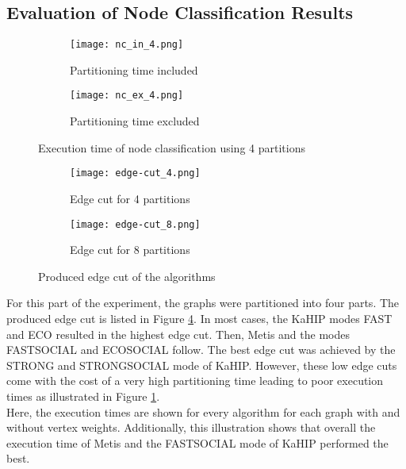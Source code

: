 \documentclass[acmsmall,nonacm,screen,review]{acmart}
\begin{document}
\subsection{Evaluation of Node Classification Results}
\begin{figure}[bt!]
     \centering
     \begin{subfigure}[b]{0.45\textwidth}
         \centering
         \texttt{[image: nc\_in\_4.png]}
         \caption{Partitioning time included}
         \label{nc_in_4}
     \end{subfigure}
     \hfill
     \begin{subfigure}[b]{0.45\textwidth}
         \centering
         \texttt{[image: nc\_ex\_4.png]}
         \caption{Partitioning time excluded}
         \label{nc_ex_4}
     \end{subfigure}
     \caption{Execution time of node classification using 4 partitions}
     \label{nc_results}
\end{figure}
\begin{figure}[bt!]
     \centering
     \begin{subfigure}[b]{0.45\textwidth}
         \centering
         \texttt{[image: edge-cut\_4.png]}
         \caption{Edge cut for 4 partitions}
         \label{cut_4}
     \end{subfigure}
     \hfill
     \begin{subfigure}[b]{0.45\textwidth}
         \centering
         \texttt{[image: edge-cut\_8.png]}
         \caption{Edge cut for 8 partitions}
         \label{cut_8}
     \end{subfigure}
     \caption{Produced edge cut of the algorithms}
     \label{cut}
\end{figure}
For this part of the experiment, the graphs were partitioned into four parts. The produced edge cut is listed in Figure \ref{cut_4}. In most cases, the KaHIP modes FAST and ECO resulted in the highest edge cut. Then, Metis and the modes FASTSOCIAL and ECOSOCIAL follow. The best edge cut was achieved by the STRONG and STRONGSOCIAL mode of KaHIP. However, these low edge cuts come with the cost of a very high partitioning time leading to poor execution times as illustrated in Figure \ref{nc_in_4}.\\
Here, the execution times are shown for every algorithm for each graph with and without vertex weights. Additionally, this illustration shows that overall the execution time of Metis and the FASTSOCIAL mode of KaHIP performed the best. \\
\end{document}

